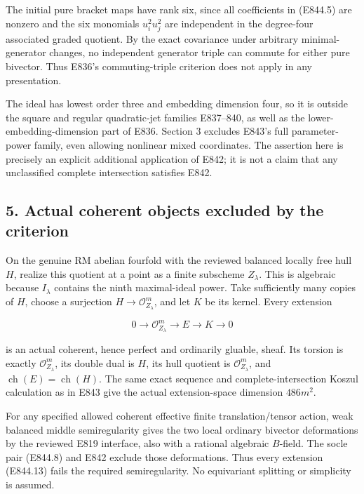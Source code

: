 The initial pure bracket maps have rank six, since all coefficients in
(E844.5) are nonzero and the six monomials \(u_i^2u_j^2\) are independent
in the degree-four associated graded quotient.
By the exact covariance under arbitrary minimal-generator changes,
no independent generator triple can commute for either pure bivector.
Thus E836's commuting-triple criterion does not apply in any presentation.

The ideal has lowest order three and embedding dimension four, so it is
outside the square and regular quadratic-jet families E837--840, as well as
the lower-embedding-dimension part of E836. Section 3 excludes E843's full
parameter-power family, even allowing nonlinear mixed coordinates.
The assertion here is precisely an explicit additional application of E842;
it is not a claim that any unclassified complete intersection satisfies E842.

\subsection{5. Actual coherent objects excluded by the criterion}\label{SF-E844:actual-coherent-objects-excluded-by-the-criterion}

On the genuine RM abelian fourfold with the reviewed balanced locally free
hull \(H\), realize this quotient at a point as a finite subscheme \(Z_\lambda\).
This is algebraic because \(I_\lambda\) contains the ninth maximal-ideal
power. Take sufficiently many copies of \(H\), choose a surjection
\(H\to\mathcal O_{Z_\lambda}^m\), and let \(K\) be its kernel.
Every extension

\[
 0\longrightarrow\mathcal O_{Z_\lambda}^m
   \longrightarrow E\longrightarrow K\longrightarrow0
 \tag{E844.13}
\]

is an actual coherent, hence perfect and ordinarily gluable, sheaf.
Its torsion is exactly \(\mathcal O_{Z_\lambda}^m\), its double dual is \(H\),
its hull quotient is \(\mathcal O_{Z_\lambda}^m\), and
\(\operatorname{ch}(E)=\operatorname{ch}(H)\).
The same exact sequence and complete-intersection Koszul calculation as in
E843 give the actual extension-space dimension \(486m^2\).

For any specified allowed coherent effective finite translation/tensor action,
weak balanced middle semiregularity gives the two local ordinary bivector
deformations by the reviewed E819 interface, also with a rational algebraic
\(B\)-field. The socle pair (E844.8) and E842 exclude those deformations.
Thus every extension (E844.13) fails the required semiregularity.
No equivariant splitting or simplicity is assumed.

